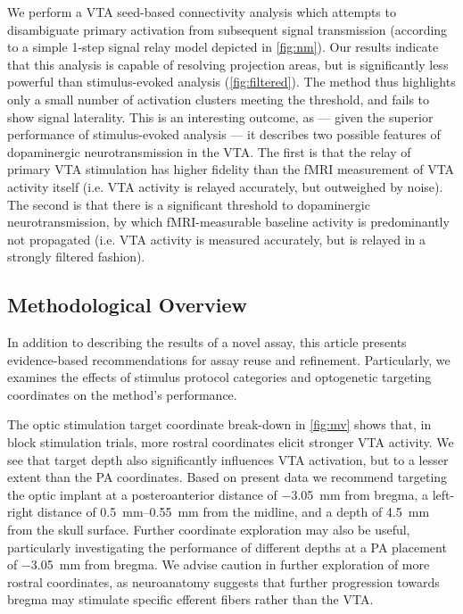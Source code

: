 We perform a VTA seed-based connectivity analysis which attempts to disambiguate primary activation from subsequent signal transmission (according to a simple 1-step signal relay model depicted in \cref{fig:nm}).
Our results indicate that this analysis is capable of resolving projection areas, but is significantly less powerful than stimulus-evoked analysis (\cref{fig:filtered}).
The method thus highlights only a small number of activation clusters meeting the threshold, and fails to show signal laterality.
This is an interesting outcome, as --- given the superior performance of stimulus-evoked analysis --- it describes two possible features of dopaminergic neurotransmission in the VTA.
The first is that the relay of primary VTA stimulation has higher fidelity than the fMRI measurement of VTA activity itself (i.e. VTA activity is relayed accurately, but outweighed by noise).
The second is that there is a significant threshold to dopaminergic neurotransmission, by which fMRI-measurable baseline activity is predominantly not propagated (i.e. VTA activity is measured accurately, but is relayed in a strongly filtered fashion).

\subsection{Methodological Overview}

In addition to describing the results of a novel assay, this article presents evidence-based recommendations for assay reuse and refinement.
Particularly, we examines the effects of stimulus protocol categories and optogenetic targeting coordinates on the method's performance.

The optic stimulation target coordinate break-down in \cref{fig:mv} shows that, in block stimulation trials, more rostral coordinates elicit stronger VTA activity.
We see that target depth also significantly influences VTA activation, but to a lesser extent than the PA coordinates.
Based on present data we recommend targeting the optic implant at
a posteroanterior distance of \SI{-3.05}{\milli\meter} from bregma,
a left-right distance of \SIrange{0.5}{0.55}{\milli\meter} from the midline,
and a depth of \SI{4.5}{\milli\meter} from the skull surface.
Further coordinate exploration may also be useful, particularly investigating the performance of different depths at a PA placement of \SI{-3.05}{\milli\meter} from bregma.
We advise caution in further exploration of more rostral coordinates, as neuroanatomy suggests that further progression towards bregma may stimulate specific efferent fibers rather than the VTA.

